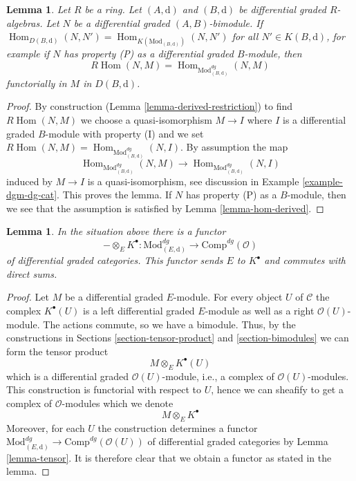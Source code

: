 \documentclass{stacks-project}
\theoremstyle{plain}
\newtheorem{lemma}[subsection]{Lemma}
\theoremstyle{definition}
\theoremstyle{remark}
\numberwithin{equation}{subsection}
\def\Hom{\mathop{\mathrm{Hom}}\nolimits}
\begin{document}
\begin{lemma}
\label{lemma-compute-derived-restriction}
Let $R$ be a ring. Let $(A, \text{d})$ and $(B, \text{d})$ be
differential graded $R$-algebras. Let $N$ be a differential
graded $(A, B)$-bimodule. If
$\Hom_{D(B, \text{d})}(N, N') = \Hom_{K(\text{Mod}_{(B, \text{d})})}(N, N')$
for all $N' \in K(B, \text{d})$, for example if $N$
has property (P) as a differential graded $B$-module, then
$$
R\Hom(N, M) = \Hom_{\text{Mod}^{dg}_{(B, \text{d})}}(N, M)
$$
functorially in $M$ in $D(B, \text{d})$.
\end{lemma}

\begin{proof}
By construction (Lemma \ref{lemma-derived-restriction})
to find $R\Hom(N, M)$ we choose a quasi-isomorphism
$M \to I$ where $I$ is a differential graded $B$-module
with property (I) and we set
$R\Hom(N, M) = \Hom_{\text{Mod}^{dg}_{(B, \text{d})}}(N, I)$.
By assumption the map
$$
\Hom_{\text{Mod}^{dg}_{(B, \text{d})}}(N, M) \longrightarrow
\Hom_{\text{Mod}^{dg}_{(B, \text{d})}}(N, I)
$$
induced by $M \to I$ is a quasi-isomorphism, see discussion in
Example \ref{example-dgm-dg-cat}. This proves the lemma.
If $N$ has property (P) as a $B$-module, then we see that the
assumption is satisfied by Lemma \ref{lemma-hom-derived}.
\end{proof}

\begin{lemma}
\label{lemma-tensor-with-complex}
In the situation above there is a functor
$$
- \otimes_E K^\bullet :
\text{Mod}^{dg}_{(E, \text{d})}
\longrightarrow
\text{Comp}^{dg}(\mathcal{O})
$$
of differential graded categories. This functor sends $E$ to $K^\bullet$
and commutes with direct sums.
\end{lemma}

\begin{proof}
Let $M$ be a differential graded $E$-module. For every object $U$ of
$\mathcal{C}$ the complex $K^\bullet(U)$ is a left differential
graded $E$-module as well as a right $\mathcal{O}(U)$-module.
The actions commute, so we have a bimodule.
Thus, by the constructions in
Sections \ref{section-tensor-product} and \ref{section-bimodules}
we can form the tensor product
$$
M \otimes_E K^\bullet(U)
$$
which is a differential graded $\mathcal{O}(U)$-module, i.e., a complex
of $\mathcal{O}(U)$-modules. This construction is functorial with respect
to $U$, hence we can sheafify to get a complex of $\mathcal{O}$-modules
which we denote
$$
M \otimes_E K^\bullet
$$
Moreover, for each $U$ the construction determines a functor
$\text{Mod}^{dg}_{(E, \text{d})} \to \text{Comp}^{dg}(\mathcal{O}(U))$
of differential graded categories by Lemma \ref{lemma-tensor}.
It is therefore clear that we obtain a functor as stated in the lemma.
\end{proof}
\end{document}
